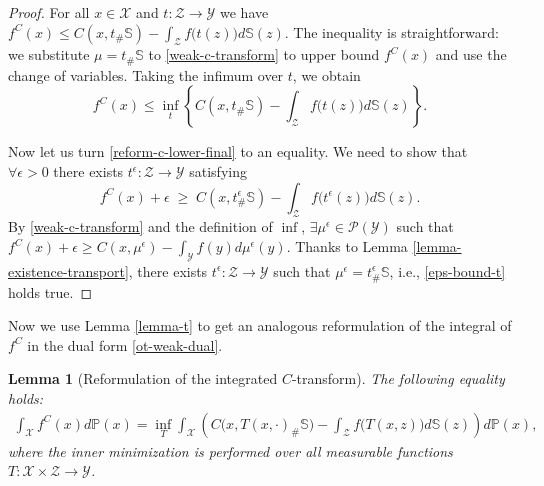 \documentclass{article} %
\newtheorem{lemma}{Lemma}
\begin{document}
\vspace{-3mm}\begin{proof}For all $x\in\mathcal{X}$ and $t:\mathcal{Z}\rightarrow\mathcal{Y}$ we have $f^{C}(x)\!\leq\!  C(x,t_{\#}\mathbb{S})-\int_{\mathcal{Z}}f\big(t(z)\big)d\mathbb{S}(z).$
The inequality is straightforward: we substitute $\mu=t_{\#}\mathbb{S}$ to \eqref{weak-c-transform} to upper bound $f^{C}(x)$ and use the change of variables. Taking the infimum over $t$, we obtain\vspace{-1.5mm}
\begin{equation}
    f^{C}(x)\!\leq\! \inf_{t}\left\lbrace C(x,t_{\#}\mathbb{S})-\int_{\mathcal{Z}}f\big(t(z)\big)d\mathbb{S}(z)\right\rbrace.
    \label{reform-c-lower-final}
\end{equation}

\vspace{-2.5mm}Now let us turn \eqref{reform-c-lower-final} to an equality. We need to show that $\forall\epsilon>0$ there exists $ t^{\epsilon}:\mathcal{Z}\rightarrow\mathcal{Y}$ satisfying
\begin{equation}
f^{C}(x)\!+\!\epsilon \; \geq\; C(x,t^{\epsilon}_{\#}\mathbb{S})\!-\!\int_{\mathcal{Z}}f\big(t^{\epsilon}(z)\big)d\mathbb{S}(z).
\label{eps-bound-t}
\end{equation}
By \eqref{weak-c-transform} and the definition of $\inf$, $\exists\mu^{\epsilon}\!\in\!\mathcal{P}(\mathcal{Y})$  such that 
$f^{C}(x)+\epsilon\geq  C(x,\mu^{\epsilon})-\int_{\mathcal{Y}}f(y)d\mu^{\epsilon}(y)$.
Thanks to Lemma \ref{lemma-existence-transport}, there exists $t^{\epsilon}:\mathcal{Z}\rightarrow\mathcal{Y}$ such that $\mu^{\epsilon}=t^{\epsilon}_{\#}\mathbb{S}$, i.e., \eqref{eps-bound-t} holds true.
\end{proof}


\vspace{-2mm}Now we use Lemma \ref{lemma-t} to get an analogous reformulation of the integral of  $f^{C}$ in the dual form \eqref{ot-weak-dual}.

\begin{lemma}[Reformulation of the integrated $C$-transform] The following equality holds:
\begin{eqnarray}
    \int_{\mathcal{X}}f^{C}(x)d\mathbb{P}(x)=
    \inf_{T}\int_{\mathcal{X}}\!\left(\! C\big(x,T(x,\cdot)_{\#}\mathbb{S}\big)\!-\!\int_{\mathcal{Z}}f\big(T(x,z)\big) d\mathbb{S}(z)\!\right)\! d\mathbb{P}(x),
    \label{rockafellar-strikes-back}
\end{eqnarray}
where the inner minimization is performed over all measurable functions $T:\mathcal{X}\times\mathcal{Z}\rightarrow\mathcal{Y}$.
\label{lemma-T}
\end{lemma}
\end{document}
